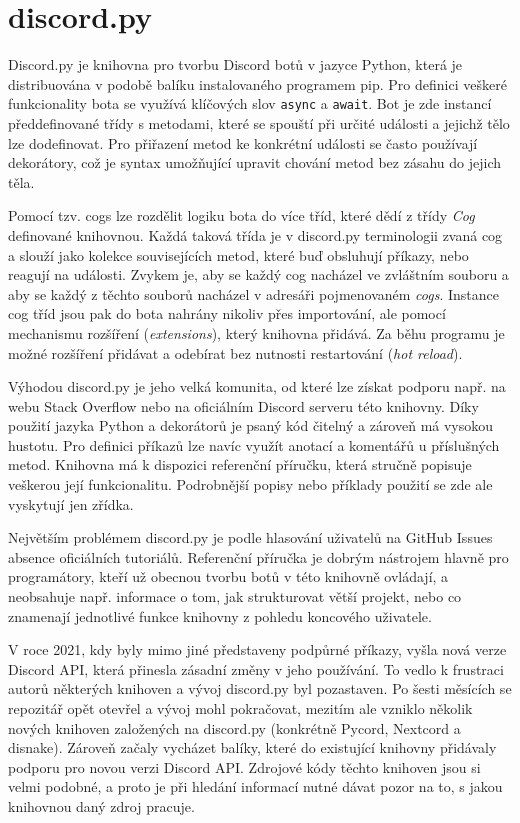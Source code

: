 \documentclass[FM]{tulthesis}
\begin{document}
	\section{discord.py}\label{_tag_section_discordpy}
	
	Discord.py je knihovna pro tvorbu Discord botů v jazyce Python, která je distribuována v podobě balíku instalovaného programem pip. Pro definici veškeré funkcionality bota se využívá klíčových slov \verb|async| a \verb|await|. Bot je zde instancí předdefinované třídy s metodami, které se spouští při určité události a jejichž tělo lze dodefinovat. Pro přiřazení metod ke konkrétní události se často používají dekorátory, což je syntax umožňující upravit chování metod bez zásahu do jejich těla.%
	
	Pomocí tzv. cogs lze rozdělit logiku bota do více tříd, které dědí z třídy \textit{Cog} definované knihovnou. Každá taková třída je v discord.py terminologii zvaná cog a slouží jako kolekce souvisejících metod, které buď obsluhují příkazy, nebo reagují na události. Zvykem je, aby se každý cog nacházel ve zvláštním souboru a aby se každý z těchto souborů nacházel v adresáři pojmenovaném \textit{cogs}. Instance cog tříd jsou pak do bota nahrány nikoliv přes importování, ale pomocí mechanismu rozšíření (\textit{extensions}), který knihovna přidává. Za běhu programu je možné rozšíření přidávat a odebírat bez nutnosti restartování (\textit{hot reload}).
	
	Výhodou discord.py je jeho velká komunita, od které lze získat podporu např. na webu Stack Overflow nebo na oficiálním Discord serveru této knihovny. Díky použití jazyka Python a dekorátorů je psaný kód čitelný a zároveň má vysokou hustotu. Pro definici příkazů lze navíc využít anotací a komentářů u příslušných metod. Knihovna má k dispozici referenční příručku, která stručně popisuje veškerou její funkcionalitu. Podrobnější popisy nebo příklady použití se zde ale vyskytují jen zřídka.
	
	Největším problémem discord.py je podle hlasování uživatelů na GitHub \mbox{Issues} absence oficiálních tutoriálů. Referenční příručka je dobrým nástrojem hlavně pro programátory, kteří už obecnou tvorbu botů v této knihovně ovládají, a neobsahuje např. informace o tom, jak strukturovat větší projekt, nebo co znamenají jednotlivé funkce knihovny z pohledu koncového uživatele.
	
	V roce 2021, kdy byly mimo jiné představeny podpůrné příkazy, vyšla nová verze Discord API, která přinesla zásadní změny v jeho používání. To vedlo k frustraci autorů některých knihoven a vývoj discord.py byl pozastaven. Po šesti měsících se repozitář opět otevřel a vývoj mohl pokračovat, mezitím ale vzniklo několik nových knihoven založených na discord.py (konkrétně Pycord, Nextcord a disnake). Zároveň začaly vycházet balíky, které do existující knihovny přidávaly podporu pro novou verzi Discord API. Zdrojové kódy těchto knihoven jsou si velmi podobné, a proto je při hledání informací nutné dávat pozor na to, s jakou knihovnou daný zdroj pracuje.
	
\end{document}
